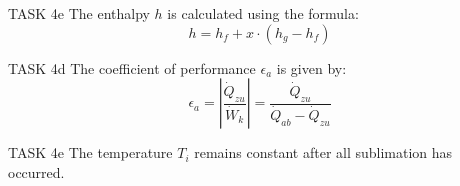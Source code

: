 TASK 4e  
The enthalpy \( h \) is calculated using the formula:  
\[
h = h_f + x \cdot (h_g - h_f)
\]  

TASK 4d  
The coefficient of performance \( \epsilon_a \) is given by:  
\[
\epsilon_a = \left| \frac{\dot{Q}_{zu}}{\dot{W}_k} \right| = \frac{\dot{Q}_{zu}}{\dot{Q}_{ab} - \dot{Q}_{zu}}
\]  

TASK 4e  
The temperature \( T_i \) remains constant after all sublimation has occurred.